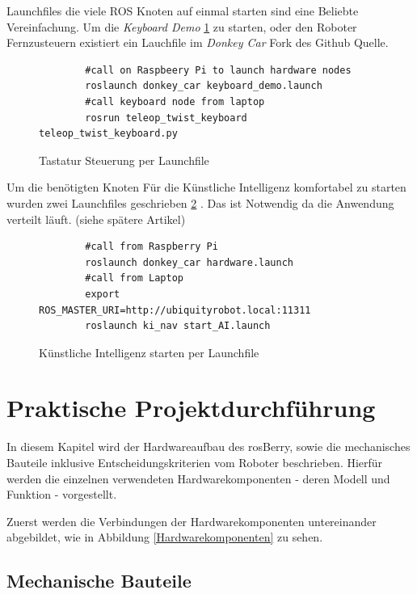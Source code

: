 \documentclass[conference]{IEEEtran}
\begin{document}
	Launchfiles die viele ROS Knoten auf einmal starten sind eine Beliebte 
	Vereinfachung. Um die \textit{Keyboard Demo}  \ref{demo} zu starten, oder 
	den Roboter Fernzusteuern existiert ein Lauchfile im \textit{Donkey Car} 
	Fork 
	des Github Quelle.
	\begin{figure}
		\centering
		\begin{verbatim}
		#call on Raspbeery Pi to launch hardware nodes
		roslaunch donkey_car keyboard_demo.launch
		#call keyboard node from laptop 
		rosrun teleop_twist_keyboard teleop_twist_keyboard.py
		\end{verbatim}
		\label{demo}
		\caption{Tastatur Steuerung per Launchfile }
	\end{figure}
	
	Um die benötigten Knoten Für die Künstliche Intelligenz komfortabel zu 
	starten wurden zwei Launchfiles geschrieben \ref{KI-launch} .  Das ist 
	Notwendig da die 
	Anwendung verteilt läuft. (siehe spätere Artikel)
	
	\begin{figure}
		\centering
		\begin{verbatim}
		#call from Raspberry Pi
		roslaunch donkey_car hardware.launch
		#call from Laptop
		export ROS_MASTER_URI=http://ubiquityrobot.local:11311
		roslaunch ki_nav start_AI.launch
		\end{verbatim}
		\label{KI-launch}
		\caption{Künstliche Intelligenz starten per Launchfile }
	\end{figure}
	
	\section{Praktische Projektdurchführung}
	
	
	In diesem Kapitel wird der Hardwareaufbau des rosBerry, sowie die mechanisches Bauteile inklusive Entscheidungskriterien vom Roboter beschrieben. 
	Hierfür werden die einzelnen verwendeten Hardwarekomponenten - deren Modell und Funktion - vorgestellt. 
	
	Zuerst werden die Verbindungen der Hardwarekomponenten untereinander abgebildet, wie in Abbildung \ref{Hardwarekomponenten} zu sehen.
	\subsection{Mechanische Bauteile}
	
\end{document}
